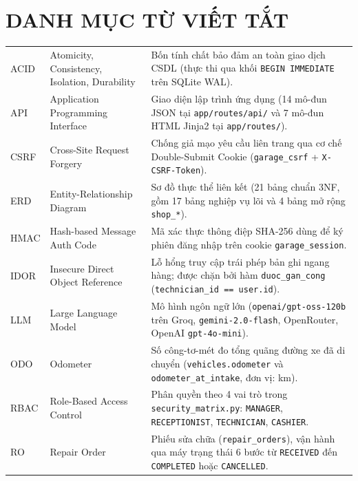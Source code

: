 \chapter*{DANH MỤC TỪ VIẾT TẮT}

\vspace{-4pt}
{\footnotesize
\renewcommand{\arraystretch}{1.05}
\noindent
\begin{tabularx}{\textwidth}{|L{2.5cm}|L{4.6cm}|Y|}
\hline
{} &  & \\
\hline
ACID & Atomicity, Consistency, Isolation, Durability & Bốn tính chất bảo đảm an toàn giao dịch CSDL (thực thi qua khối \texttt{BEGIN IMMEDIATE} trên SQLite WAL). \\
\hline
API & Application Programming Interface & Giao diện lập trình ứng dụng (14 mô-đun JSON tại \texttt{app/routes/api/} và 7 mô-đun HTML Jinja2 tại \texttt{app/routes/}). \\
\hline
CSRF & Cross-Site Request Forgery & Chống giả mạo yêu cầu liên trang qua cơ chế Double-Submit Cookie (\texttt{garage\_csrf} + \texttt{X-CSRF-Token}). \\
\hline
ERD & Entity-Relationship Diagram & Sơ đồ thực thể liên kết (21 bảng chuẩn 3NF, gồm 17 bảng nghiệp vụ lõi và 4 bảng mở rộng \texttt{shop\_*}). \\
\hline
HMAC & Hash-based Message Auth Code & Mã xác thực thông điệp SHA-256 dùng để ký phiên đăng nhập trên cookie \texttt{garage\_session}. \\
\hline
IDOR & Insecure Direct Object Reference & Lỗ hổng truy cập trái phép bản ghi ngang hàng; được chặn bởi hàm \texttt{duoc\_gan\_cong} (\texttt{technician\_id == user.id}). \\
\hline
LLM & Large Language Model & Mô hình ngôn ngữ lớn (\texttt{openai/gpt-oss-120b} trên Groq, \texttt{gemini-2.0-flash}, OpenRouter, OpenAI \texttt{gpt-4o-mini}). \\
\hline
ODO & Odometer & Số công-tơ-mét đo tổng quãng đường xe đã di chuyển (\texttt{vehicles.odometer} và \texttt{odometer\_at\_intake}, đơn vị: km). \\
\hline
RBAC & Role-Based Access Control & Phân quyền theo 4 vai trò trong \texttt{security\_matrix.py}: \texttt{MANAGER}, \texttt{RECEPTIONIST}, \texttt{TECHNICIAN}, \texttt{CASHIER}. \\
\hline
RO & Repair Order & Phiếu sửa chữa (\texttt{repair\_orders}), vận hành qua máy trạng thái 6 bước từ \texttt{RECEIVED} đến \texttt{COMPLETED} hoặc \texttt{CANCELLED}. \\

\end{tabularx}}
